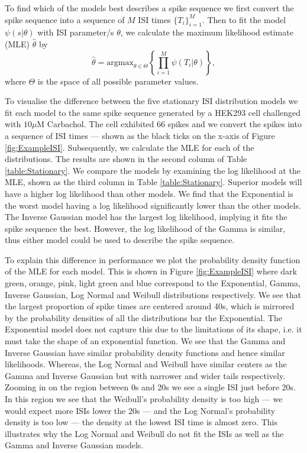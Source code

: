 \documentclass[../main.tex]{subfiles}
\begin{document}
To find which of the models best describes a  spike sequence we first convert the spike sequence into a sequence of $M$ ISI times $\{T_i\}_{i=1}^M$. Then to fit the model $\psi(s|\theta)$ with ISI parameter/s $\theta$, we calculate the maximum likelihood estimate (MLE) $\hat \theta$  by 
$$\hat \theta  = \mathrm{arg max}_{\theta \in \Theta} \left\{ \prod ^M_{i=1} \psi(T_i | \theta ) \right\},$$
where $\Theta$ is the space of all possible parameter values. 

To visualise the difference between the five stationary ISI distribution models we fit each model to the same spike sequence generated by a HEK293 cell challenged with $10\mu \mathrm{M}$ Carbachol. The cell exhibited 66  spikes and we convert the spikes into a sequence of ISI times --- shown as the black ticks on the x-axis of Figure \ref{fig:ExampleISI}. Subsequently, we calculate the MLE for each of the distributions. The results are shown in the second column of Table \ref{table:Stationary}. We compare the models by examining the log likelihood at the MLE, shown as the third column in Table \ref{table:Stationary}. Superior models will have a higher log likelihood than other models. We find that the Exponential is the worst model having a log likelihood significantly lower than the other models. The Inverse Gaussian model has the largest log likelihood, implying it fits the spike sequence the best. However, the log likelihood of the Gamma is similar, thus either model could be used to describe the spike sequence.  

 To explain this difference in performance we plot the probability density function  of the MLE for each model. This is shown in Figure \ref{fig:ExampleISI} where dark green, orange, pink, light green and blue correspond to the Exponential, Gamma, Inverse Gaussian, Log Normal and Weibull distributions respectively. We see that the largest proportion of spike times are centered around 40s, which is mirrored by the probability densities of all the distributions bar the Exponential. The Exponential model does not capture this due to the limitations of its shape, i.e. it must take the shape of an exponential function. We see that the Gamma and Inverse Gaussian have similar probability density functions and hence similar likelihoods. Whereas, the Log Normal and Weibull have similar centers as the Gamma and Inverse Gaussian but with narrower and wider tails respectively. Zooming in on the region between 0s and 20s we see a single ISI just before 20s. In this region we see that the Weibull's probability density is too high --- we would expect more ISIs lower the 20s --- and the Log Normal's probability density is too low --- the density at the lowest ISI time is almost zero. This illustrates why the Log Normal and Weibull do not fit the ISIs as well as the Gamma and Inverse Gaussian models. 
\end{document}
